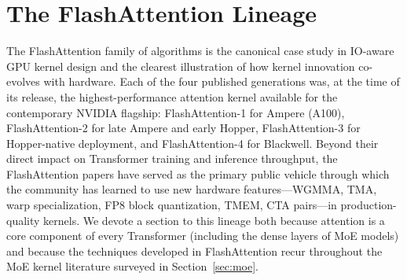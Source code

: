 \documentclass[10pt]{article}
\begin{document}

%
%
%

\section{The FlashAttention Lineage}
\label{sec:flash}

The FlashAttention family of algorithms is the canonical case study in IO-aware GPU kernel design and the clearest illustration of how kernel innovation co-evolves with hardware. Each of the four published generations was, at the time of its release, the highest-performance attention kernel available for the contemporary NVIDIA flagship: FlashAttention-1 for Ampere (A100), FlashAttention-2 for late Ampere and early Hopper, FlashAttention-3 for Hopper-native deployment, and FlashAttention-4 for Blackwell. Beyond their direct impact on Transformer training and inference throughput, the FlashAttention papers have served as the primary public vehicle through which the community has learned to use new hardware features---WGMMA, TMA, warp specialization, FP8 block quantization, TMEM, CTA pairs---in production-quality kernels. We devote a section to this lineage both because attention is a core component of every Transformer (including the dense layers of MoE models) and because the techniques developed in FlashAttention recur throughout the MoE kernel literature surveyed in Section~\ref{sec:moe}.
\end{document}
